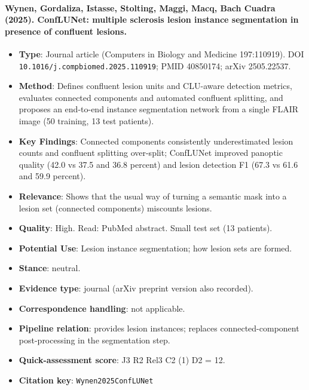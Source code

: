 \documentclass[journal,onecolumn]{IEEEtran}
\begin{document}
\paragraph{Wynen, Gordaliza, Istasse, Stolting, Maggi, Macq, Bach Cuadra (2025). ConfLUNet: multiple sclerosis lesion instance segmentation in presence of confluent lesions.~\cite{Wynen2025ConfLUNet}}\mbox{}

\begin{itemize}

\item{} \textbf{Type}: Journal article (Computers in Biology and Medicine 197:110919). DOI \nolinkurl{10.1016/j.compbiomed.2025.110919}; PMID 40850174; arXiv 2505.22537.

\item{} \textbf{Method}: Defines confluent lesion units and CLU-aware detection metrics, evaluates connected components and automated confluent splitting, and proposes an end-to-end instance segmentation network from a single FLAIR image (50 training, 13 test patients).

\item{} \textbf{Key Findings}: Connected components consistently underestimated lesion counts and confluent splitting over-split; ConfLUNet improved panoptic quality (42.0 vs 37.5 and 36.8 percent) and lesion detection F1 (67.3 vs 61.6 and 59.9 percent).

\item{} \textbf{Relevance}: Shows that the usual way of turning a semantic mask into a lesion set (connected components) miscounts lesions.

\item{} \textbf{Quality}: High. Read: PubMed abstract. Small test set (13 patients).

\item{} \textbf{Potential Use}: Lesion instance segmentation; how lesion sets are formed.

\item{} \textbf{Stance}: neutral.

\item{} \textbf{Evidence type}: journal (arXiv preprint version also recorded).

\item{} \textbf{Correspondence handling}: not applicable.

\item{} \textbf{Pipeline relation}: provides lesion instances; replaces connected-component post-processing in the segmentation step.

\item{} \textbf{Quick-assessment score}: J3 R2 Rel3 C2 (1) D2 = 12.

\item{} \textbf{Citation key}: \texttt{Wynen2025ConfLUNet}

\end{itemize}
\end{document}
